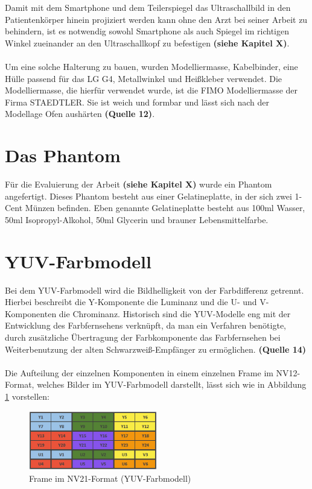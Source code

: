 Damit mit dem Smartphone und dem Teilerspiegel das Ultraschallbild in den Patientenkörper hinein projiziert werden kann ohne den Arzt bei seiner Arbeit zu behindern, ist es notwendig sowohl Smartphone als auch Spiegel im richtigen Winkel zueinander an den Ultraschallkopf zu befestigen \textbf{(siehe Kapitel X)}.
\\
\\
Um eine solche Halterung zu bauen, wurden Modelliermasse, Kabelbinder, eine Hülle passend für das LG G4, Metallwinkel und Heißkleber verwendet. Die Modelliermasse, die hierfür verwendet wurde, ist die FIMO Modelliermasse der Firma STAEDTLER. Sie ist weich und formbar und lässt sich nach der Modellage Ofen aushärten \textbf{(Quelle 12)}.

\section{Das Phantom} \label{Phantom}

Für die Evaluierung der Arbeit \textbf{(siehe Kapitel X)} wurde ein Phantom angefertigt. Dieses Phantom besteht aus einer Gelatineplatte, in der sich zwei 1-Cent Münzen befinden. Eben genannte Gelatineplatte besteht aus 100ml Wasser, 50ml Isopropyl-Alkohol, 50ml Glycerin und brauner Lebensmittelfarbe.

\section{YUV-Farbmodell} \label{YUV}

Bei dem YUV-Farbmodell wird die Bildhelligkeit von der Farbdifferenz getrennt. Hierbei beschreibt die Y-Komponente die Luminanz und die U- und V-Komponenten die Chrominanz. Historisch sind die YUV-Modelle eng mit der Entwicklung des Farbfernsehens verknüpft, da man ein Verfahren benötigte, durch zusätzliche Übertragung der Farbkomponente das Farbfernsehen bei Weiterbenutzung der alten Schwarzweiß-Empfänger zu ermöglichen. \textbf{(Quelle 14)}
\\
\\
Die Aufteilung der einzelnen Komponenten in einem einzelnen Frame im NV12-Format, welches Bilder im YUV-Farbmodell darstellt, lässt sich wie in Abbildung \ref{fig:YUV_Frame} vorstellen:


\begin{figure}[h]
	\centering
	\includegraphics[width=0.5\textwidth]{Bilder/Materialien_und_Grundlagen/YUV_Frame.PNG}
	\caption{Frame im NV21-Format (YUV-Farbmodell)}
	\label{fig:YUV_Frame}
\end{figure}

